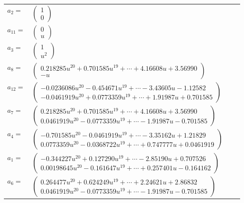 \documentclass[1p]{elsarticle_modified}
\theoremstyle{definition}
\begin{document}
\begin{tabular}{m{7pt} m{180pt} m{7pt} m{180pt} }
\flushright $a_{2}=$&$\begin{pmatrix}1\\0\end{pmatrix}$ \\
\flushright $a_{11}=$&$\begin{pmatrix}0\\u\end{pmatrix}$ \\
\flushright $a_{3}=$&$\begin{pmatrix}1\\u^2\end{pmatrix}$ \\
\flushright $a_{8}=$&$\begin{pmatrix}0.218285 u^{20}+0.701585 u^{19}+\cdots+4.16608 u+3.56990\\- u\end{pmatrix}$ \\
\flushright $a_{12}=$&$\begin{pmatrix}-0.0236086 u^{20}-0.454671 u^{19}+\cdots-3.43605 u-1.12582\\-0.0461919 u^{20}+0.0773359 u^{19}+\cdots+1.91987 u+0.701585\end{pmatrix}$ \\
\flushright $a_{7}=$&$\begin{pmatrix}0.218285 u^{20}+0.701585 u^{19}+\cdots+4.16608 u+3.56990\\0.0461919 u^{20}-0.0773359 u^{19}+\cdots-1.91987 u-0.701585\end{pmatrix}$ \\
\flushright $a_{4}=$&$\begin{pmatrix}-0.701585 u^{20}-0.0461919 u^{19}+\cdots-3.35162 u+1.21829\\0.0773359 u^{20}-0.0368722 u^{19}+\cdots+0.747777 u+0.0461919\end{pmatrix}$ \\
\flushright $a_{1}=$&$\begin{pmatrix}-0.344227 u^{20}+0.127290 u^{19}+\cdots-2.85190 u+0.707526\\0.00198645 u^{20}-0.161647 u^{19}+\cdots+0.257401 u-0.164162\end{pmatrix}$ \\
\flushright $a_{6}=$&$\begin{pmatrix}0.264477 u^{20}+0.624249 u^{19}+\cdots+2.24621 u+2.86832\\0.0461919 u^{20}-0.0773359 u^{19}+\cdots-1.91987 u-0.701585\end{pmatrix}$ \\

\end{tabular}
\end{document}
